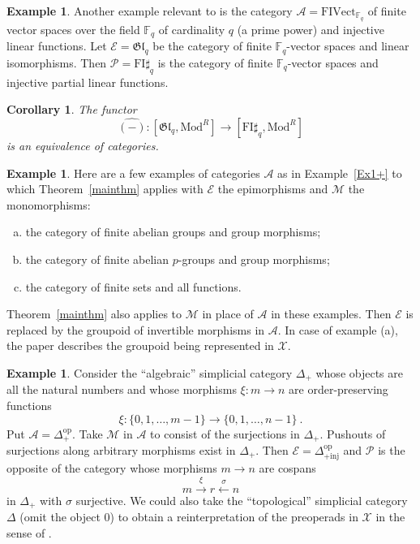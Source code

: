 \documentclass[a4paper,12pt,reqno]{amsart}
\newtheorem{corollary}[theorem]{Corollary}
\theoremstyle{definition}
\newtheorem{example}[theorem]{Example}
\theoremstyle{fact}
\theoremstyle{genquest}
\theoremstyle{step}
\newcommand{\lra}{\longrightarrow}
\newcommand{\lla}{\longleftarrow}
\def\CA{{\mathscr A}}
\def\CE{{\mathscr E}}
\def\CM{{\mathscr M}}
\def\CP{{\mathscr P}}
\def\CX{{\mathscr X}}
\begin{document}
\begin{example}
Another example relevant to \cite{repfgl} is the category $\CA = \mathrm{FIVect}_{\mathbb{F}_q}$
of finite vector spaces over the field $\mathbb{F}_q$ of cardinality 
$q$ (a prime power) and injective linear functions.
Let $\CE = \mathfrak{Gl}_q$ be the category of finite
$\mathbb{F}_q$-vector spaces and linear isomorphisms. 
Then $\CP = \mathrm{FI}\sharp_q$ is the
category of finite $\mathbb{F}_q$-vector spaces and injective 
partial linear functions.

\begin{corollary} The functor
$$\widehat{(-)} : [\mathfrak{Gl}_q, \mathrm{Mod}^R] \lra [\mathrm{FI}\sharp_q, \mathrm{Mod}^R]$$
is an equivalence of categories.
\end{corollary}
\end{example}   

\begin{example}
Here are a few examples of categories $\CA$ as in Example~\ref{Ex1+} to which 
Theorem~\ref{mainthm} applies with $\CE$ 
the epimorphisms and $\CM$ the monomorphisms:
\begin{enumerate}[(a)]
\item the category of finite abelian groups and group morphisms;
\item the category of finite abelian $p$-groups and group morphisms;
\item the category of finite sets and all functions.
\end{enumerate}
Theorem~\ref{mainthm} also applies to $\CM$ in place of $\CA$
in these examples. Then $\CE$ is replaced by the groupoid of
invertible morphisms in $\CA$. In case of example (a),
the paper \cite{HillarDarren2007} describes the groupoid being represented in $\CX$. 
\end{example}

\begin{example}
Consider the ``algebraic'' simplicial category $\Delta_+$ 
whose objects are all the natural numbers and 
whose morphisms $\xi : m\lra n$ are order-preserving functions 
$$\xi : \{0, 1, \dots , m-1\}\lra \{0, 1, \dots , n-1\} \ .$$
Put $\CA = \Delta_+^{\mathrm{op}}$.
Take $\CM$ in $\CA$ to consist of the surjections in $\Delta_+$.
Pushouts of surjections along arbitrary morphisms exist in 
$\Delta_+$. 
Then $\CE = \Delta_{+\mathrm{inj}}^{\mathrm{op}}$
and $\CP$ is the opposite of the category whose morphisms
$m\lra n$ are cospans $$m\stackrel{\xi}\lra r \stackrel{\sigma}\lla n$$
in $\Delta_+$ with $\sigma$ surjective. 
We could also take the ``topological'' simplicial category 
$\Delta$ (omit the object $0$) to obtain
a reinterpretation of the preoperads in $\CX$ in the sense of 
\cite{Berger1996}.
\end{example}
\end{document}

